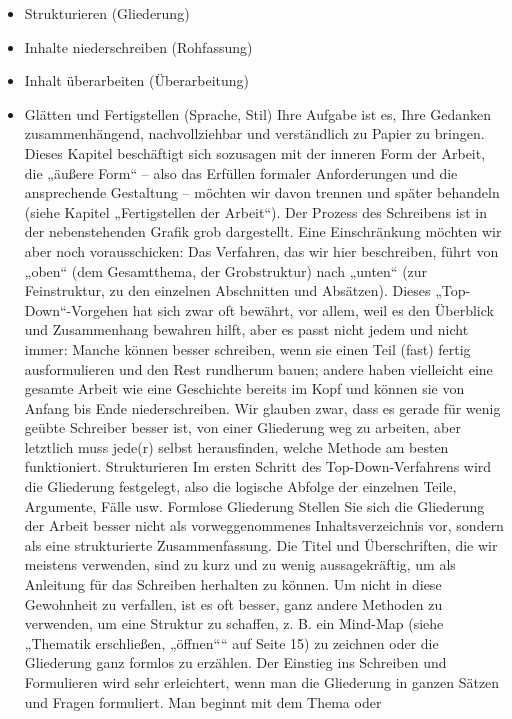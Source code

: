 \documentclass[]{book}
\providecommand{\tightlist}{%
  \setlength{\itemsep}{0pt}\setlength{\parskip}{0pt}}
\theoremstyle{definition}
\theoremstyle{definition}
\theoremstyle{definition}
\theoremstyle{remark}
\begin{document}
\begin{itemize}
\tightlist
\item
  Strukturieren (Gliederung)
\item
  Inhalte niederschreiben (Rohfassung)
\item
  Inhalt überarbeiten (Überarbeitung)
\item
  Glätten und Fertigstellen (Sprache, Stil) Ihre Aufgabe ist es, Ihre
  Gedanken zusammenhängend, nachvollziehbar und verständlich zu Papier
  zu bringen. Dieses Kapitel beschäftigt sich sozusagen mit der inneren
  Form der Arbeit, die „äußere Form`` -- also das Erfüllen formaler
  Anforderungen und die ansprechende Gestaltung -- möchten wir davon
  trennen und später behandeln (siehe Kapitel „Fertigstellen der
  Arbeit``). Der Prozess des Schreibens ist in der nebenstehenden Grafik
  grob dargestellt. Eine Einschränkung möchten wir aber noch
  vorausschicken: Das Verfahren, das wir hier beschreiben, führt von
  „oben`` (dem Gesamtthema, der Grobstruktur) nach „unten`` (zur
  Feinstruktur, zu den einzelnen Abschnitten und Absätzen). Dieses „Top-
  Down``-Vorgehen hat sich zwar oft bewährt, vor allem, weil es den
  Überblick und Zusammenhang bewahren hilft, aber es passt nicht jedem
  und nicht immer: Manche können besser schreiben, wenn sie einen Teil
  (fast) fertig ausformulieren und den Rest rundherum bauen; andere
  haben vielleicht eine gesamte Arbeit wie eine Geschichte bereits im
  Kopf und können sie von Anfang bis Ende niederschreiben. Wir glauben
  zwar, dass es gerade für wenig geübte Schreiber besser ist, von einer
  Gliederung weg zu arbeiten, aber letztlich muss jede(r) selbst
  herausfinden, welche Methode am besten funktioniert. Strukturieren Im
  ersten Schritt des Top-Down-Verfahrens wird die Gliederung festgelegt,
  also die logische Abfolge der einzelnen Teile, Argumente, Fälle usw.
  Formlose Gliederung Stellen Sie sich die Gliederung der Arbeit besser
  nicht als vorweggenommenes Inhaltsverzeichnis vor, sondern als eine
  strukturierte Zusammenfassung. Die Titel und Überschriften, die wir
  meistens verwenden, sind zu kurz und zu wenig aussagekräftig, um als
  Anleitung für das Schreiben herhalten zu können. Um nicht in diese
  Gewohnheit zu verfallen, ist es oft besser, ganz andere Methoden zu
  verwenden, um eine Struktur zu schaffen, z. B. ein Mind-Map (siehe
  „Thematik erschließen, „öffnen```` auf Seite 15) zu zeichnen oder die
  Gliederung ganz formlos zu erzählen. Der Einstieg ins Schreiben und
  Formulieren wird sehr erleichtert, wenn man die Gliederung in ganzen
  Sätzen und Fragen formuliert. Man beginnt mit dem Thema oder

\end{itemize}
\end{document}
